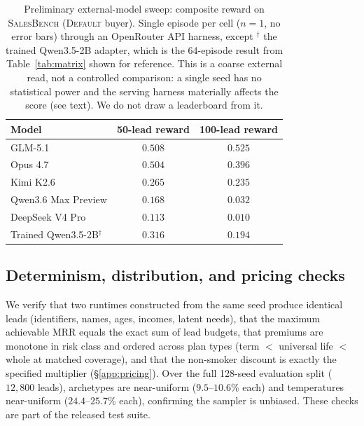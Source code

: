\documentclass{article} %
\newcommand{\salesbench}{\textsc{SalesBench}}
\begin{document}
\begin{table}[t]
\centering
\small
\begin{tabular}{lcc}
\toprule
\textbf{Model} & \textbf{50-lead reward} & \textbf{100-lead reward} \\
\midrule
GLM-5.1                      & $0.508$ & $0.525$ \\
Opus 4.7                     & $0.504$ & $0.396$ \\
Kimi K2.6                    & $0.265$ & $0.235$ \\
Qwen3.6 Max Preview          & $0.168$ & $0.032$ \\
DeepSeek V4 Pro              & $0.113$ & $0.010$ \\
\midrule
Trained Qwen3.5-2B$^{\dagger}$ & $0.316$ & $0.194$ \\
\bottomrule
\end{tabular}
\caption{Preliminary external-model sweep: composite reward on \salesbench{} (\textsc{Default} buyer). Single episode
per cell ($n{=}1$, no error bars) through an OpenRouter API harness, except $^{\dagger}$ the trained Qwen3.5-2B adapter,
which is the 64-episode result from Table~\ref{tab:matrix} shown for reference. This is a coarse external read, not a
controlled comparison: a single seed has no statistical power and the serving harness materially affects the score (see
text). We do not draw a leaderboard from it.}
\label{tab:apisweep}
\end{table}

\subsection{Determinism, distribution, and pricing checks}
\label{app:determinism}
We verify that two runtimes constructed from the same seed produce identical leads (identifiers, names, ages, incomes,
latent needs), that the maximum achievable MRR equals the exact sum of lead budgets, that premiums are monotone in risk
class and ordered across plan types (term $<$ universal life $<$ whole at matched coverage), and that the non-smoker discount
is exactly the specified multiplier (\S\ref{app:pricing}). Over the full 128-seed evaluation split ($12{,}800$ leads),
archetypes are near-uniform ($9.5\text{--}10.6\%$ each) and temperatures near-uniform ($24.4\text{--}25.7\%$ each), confirming
the sampler is unbiased. These checks are part of the released test suite.
\end{document}
